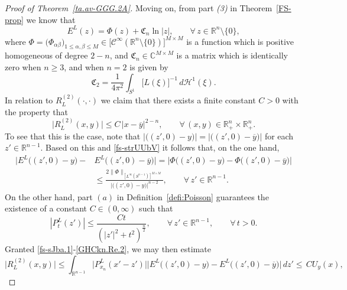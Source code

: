 \documentclass[11pt,reqno]{amsart}
\numberwithin{equation}{section}
\theoremstyle{remark}
\begin{document}
\begin{proof}[Proof of Theorem~\ref{ta.av-GGG.2A}]
Moving on, from part {\it (3)} in Theorem~\ref{FS-prop} we know that 
%
\begin{equation}\label{fs-strUUbV}
E^L(z)=\Phi(z)+{\mathfrak{C}}_n\ln|z|,\qquad\forall\,z\in\mathbb{R}^n\setminus\{0\},
\end{equation}
%
where $\Phi=\big(\Phi_{\alpha\beta}\big)_{1\leq\alpha,\beta\leq M}
\in\big[{\mathscr{C}}^\infty(\mathbb{R}^n\setminus\{0\})\big]^{M\times M}$ is a function 
which is positive homogeneous of degree $2-n$, and ${\mathfrak{C}}_n\in{\mathbb{C}}^{M\times M}$
is a matrix which is identically zero when $n\geq 3$, and when $n=2$ is given by 
%
\begin{equation}\label{Fm-PjkX}
{\mathfrak{C}}_2=\frac{1}{4\pi^2}\int_{S^{1}}\big[L(\xi)\big]^{-1}\,d{\mathcal{H}}^1(\xi).
\end{equation}
%
In relation to $R^{(2)}_L(\cdot,\cdot)$ we claim that there exists a finite constant $C>0$ with the property that
%
\begin{equation}\label{Rj-222}
\big|R^{(2)}_L(x,y)\big|\leq C\,|x-{\overline{y}}|^{2-n},
\qquad\forall\,(x,y)\in{\mathbb{R}}^n_{+}\times{\mathbb{R}}^n_{+}.
\end{equation}
%
To see that this is the case, note that $\big|\big((z',0)-y\big)\big|=\big|\big((z',0)-\overline{y}\big)\big|$ 
for each $z'\in{\mathbb{R}}^{n-1}$. Based on this and \eqref{fs-strUUbV} it follows that, on the one hand, 
%
\begin{align}\label{fs-sJba.1}
\big|E^L\big((z',0)-y\big)-& E^L\big((z',0)-\overline{y}\big)\big|
=\big|\Phi\big((z',0)-y\big)-\Phi\big((z',0)-\overline{y}\big)\big|
\nonumber\\[4pt]
& \leq\frac{2\|\Phi\|_{[L^\infty(S^{n-1})]^{M\times M}}}{\big|\big((z',0)-y\big)\big|^{n-2}},
\qquad\forall\,z'\in{\mathbb{R}}^{n-1}.
\end{align}
%
On the other hand, part $(a)$ in Definition~\ref{defi:Poisson} guarantees the 
existence of a constant $C\in(0,\infty)$ such that
%
\begin{equation}\label{GHCkn.Re.2}
|P^L_t(z')|\leq\frac{Ct}{(|z'|^2+t^2)^{\frac{n}{2}}},\qquad\forall\,z'\in\mathbb{R}^{n-1},
\qquad\forall\,t>0.
\end{equation}
%
Granted \eqref{fs-sJba.1}-\eqref{GHCkn.Re.2}, we may then estimate 
%
\begin{equation}\label{GBbohg-865gbp}
\big|R^{(2)}_L(x,y)\big|
\leq\int_{{\mathbb{R}}^{n-1}}\big|P^L_{x_n}(x'-z')\big|
\big|E^L\big((z',0)-y\big)-E^L\big((z',0)-\overline{y}\big)\big|\,dz'
\leq\,CU_y(x),\quad
\end{equation}

\end{proof}
\end{document}

